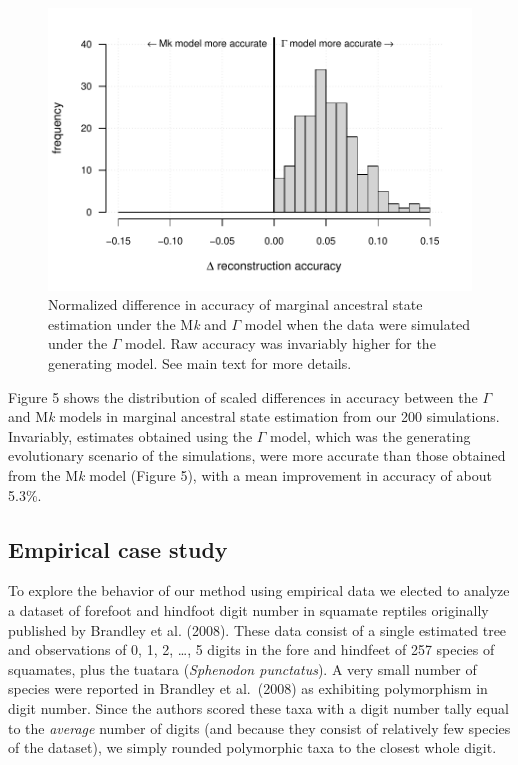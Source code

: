\documentclass[fleqn,10pt,lineno]{wlpeerj} %
\begin{document}
\begin{figure}
\includegraphics[width=1\linewidth]{Revell-and-Harmon.fitgammaMk.PeerJ_files/figure-latex/unnamed-chunk-9-1} \caption{Normalized difference in accuracy of marginal ancestral state estimation under the M\emph{k} and $\Gamma$ model when the data were simulated under the $\Gamma$ model. Raw accuracy was invariably higher for the generating model. See main text for more details.}\label{fig:unnamed-chunk-9}
\end{figure}

Figure 5 shows the distribution of scaled differences in accuracy between the \(\Gamma\) and M\emph{k} models in marginal ancestral state estimation from our 200 simulations. Invariably, estimates obtained using the \(\Gamma\) model, which was the generating evolutionary scenario of the simulations, were more accurate than those obtained from the M\emph{k} model (Figure 5), with a mean improvement in accuracy of about 5.3\%.

\subsection{Empirical case study}\label{empirical-case-study}

To explore the behavior of our method using empirical data we elected to analyze a dataset of forefoot and hindfoot digit number in squamate reptiles originally published by Brandley et al. (2008). These data consist of a single estimated tree and observations of 0, 1, 2, \ldots, 5 digits in the fore and hindfeet of 257 species of squamates, plus the tuatara (\emph{Sphenodon punctatus}). A very small number of species were reported in Brandley et al.~(2008) as exhibiting polymorphism in digit number. Since the authors scored these taxa with a digit number tally equal to the \emph{average} number of digits (and because they consist of relatively few species of the dataset), we simply rounded polymorphic taxa to the closest whole digit.
\end{document}

